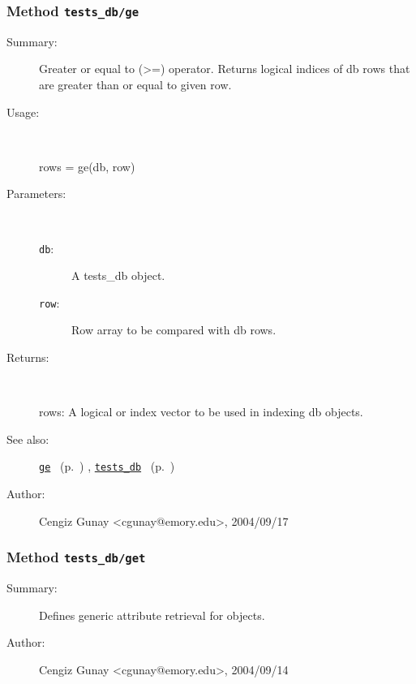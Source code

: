 \subsubsection[Method \texttt{ge}]{Method \texttt{tests\_db/ge}}%
%
\label{ref_tests_db__ge}%
\hypertarget{ref_tests_db__ge}{}%
\begin{description}
\item[Summary:]Greater or equal to (>=) operator. Returns logical indices of db rows 
	that are greater than or equal to given row.
%
\item[Usage:]~%
\begin{lyxcode}%
rows = ge(db, row)
%
\end{lyxcode}%
%
%
\item[Parameters:]~
\begin{description}%
\item[\texttt{db}:]
 A tests\_db object.
\item[\texttt{row}:]
 Row array to be compared with db rows.
\end{description}%
%
\item[Returns:
]~

	rows: A logical or index vector to be used in indexing db objects. 
%
%
\item[See also:]%
\hyperlink{ref_ge}{\texttt{ge}}%
\ (p.~\pageref{ref_ge})%
%
, \hyperlink{ref_tests_db}{\texttt{tests\_db}}%
\ (p.~\pageref{ref_tests_db})%
%
%
\item[Author:]%
Cengiz Gunay <cgunay@emory.edu>, 2004/09/17
%
\end{description}
\methodline%
\subsubsection[Method \texttt{get}]{Method \texttt{tests\_db/get}}%
%
\label{ref_tests_db__get}%
\hypertarget{ref_tests_db__get}{}%
\begin{description}
\item[Summary:]Defines generic attribute retrieval for objects.
%
%
%
%
%
%
%
\item[Author:]%
Cengiz Gunay <cgunay@emory.edu>, 2004/09/14
%
\end{description}
\methodline%
